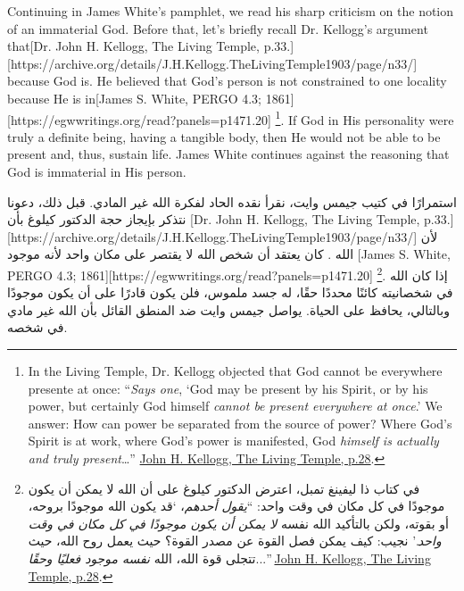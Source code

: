 Continuing in James White’s pamphlet, we read his sharp criticism on the notion of an immaterial God. Before that, let’s briefly recall Dr. Kellogg’s argument that[Dr. John H. Kellogg, The Living Temple, p.33.][https://archive.org/details/J.H.Kellogg.TheLivingTemple1903/page/n33/] because God is. He believed that God’s person is not constrained to one locality because He is in[James S. White, PERGO 4.3; 1861][https://egwwritings.org/read?panels=p1471.20] \footnote{In the Living Temple, Dr. Kellogg objected that God cannot be everywhere presente at once: “\textit{Says one}, ‘God may be present by his Spirit, or by his power, but certainly God himself \textit{cannot be present everywhere at once}.’ We answer: How can power be separated from the source of power? Where God’s Spirit is at work, where God’s power is manifested, God \textit{himself is actually and truly present}…” \href{https://archive.org/details/J.H.Kellogg.TheLivingTemple1903/page/n29/}{John H. Kellogg, The Living Temple, p.28}.}. If God in His personality were truly a definite being, having a tangible body, then He would not be able to be present and, thus, sustain life. James White continues against the reasoning that God is immaterial in His person.


استمرارًا في كتيب جيمس وايت، نقرأ نقده الحاد لفكرة الله غير المادي. قبل ذلك، دعونا نتذكر بإيجاز حجة الدكتور كيلوغ بأن [Dr. John H. Kellogg, The Living Temple, p.33.][https://archive.org/details/J.H.Kellogg.TheLivingTemple1903/page/n33/] لأن الله . كان يعتقد أن شخص الله لا يقتصر على مكان واحد لأنه موجود [James S. White, PERGO 4.3; 1861][https://egwwritings.org/read?panels=p1471.20] \footnote{في كتاب ذا ليفينغ تمبل، اعترض الدكتور كيلوغ على أن الله لا يمكن أن يكون موجودًا في كل مكان في وقت واحد: “\textit{يقول أحدهم}، ‘قد يكون الله موجودًا بروحه، أو بقوته، ولكن بالتأكيد الله نفسه \textit{لا يمكن أن يكون موجودًا في كل مكان في وقت واحد}.’ نجيب: كيف يمكن فصل القوة عن مصدر القوة؟ حيث يعمل روح الله، حيث تتجلى قوة الله، الله \textit{نفسه موجود فعليًا وحقًا}...” \href{https://archive.org/details/J.H.Kellogg.TheLivingTemple1903/page/n29/}{John H. Kellogg, The Living Temple, p.28}.}. إذا كان الله في شخصانيته كائنًا محددًا حقًا، له جسد ملموس، فلن يكون قادرًا على أن يكون موجودًا  وبالتالي، يحافظ على الحياة. يواصل جيمس وايت ضد المنطق القائل بأن الله غير مادي في شخصه.


